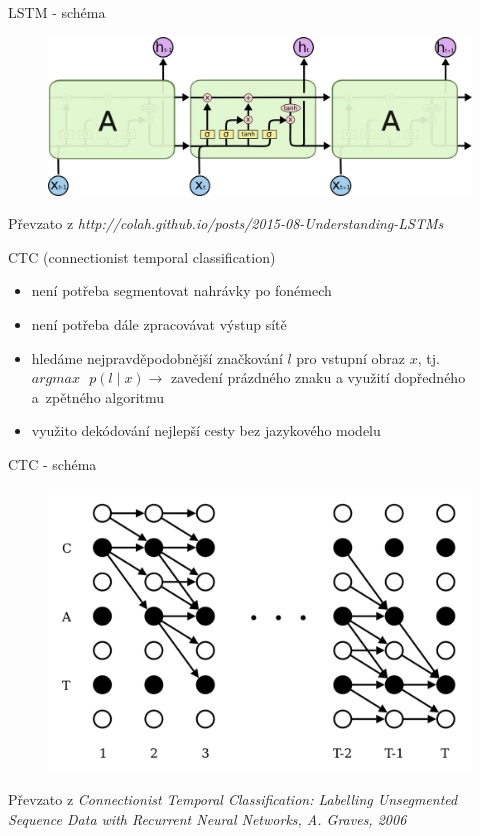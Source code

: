 \documentclass[10pt]{beamer}
\begin{document}
\begin{frame}{LSTM - schéma}
	\begin{figure}
		\includegraphics[width= 0.8\linewidth]{lstm.png}
	\end{figure}
	Převzato z \textit{http://colah.github.io/posts/2015-08-Understanding-LSTMs}
\end{frame}

\begin{frame}{CTC (connectionist temporal classification)}
	\begin{itemize}
		\item není potřeba segmentovat nahrávky po fonémech
		\item není potřeba dále zpracovávat výstup sítě
		\item hledáme nejpravděpodobnější značkování $ l $ pro vstupní obraz $ x $, tj. $ argmax \text{ } p(l \mid x) \rightarrow $ zavedení prázdného znaku a využití dopředného a~zpětného algoritmu 
		\item využito dekódování nejlepší cesty bez jazykového modelu
	\end{itemize}
\end{frame}

\begin{frame}{CTC - schéma}
	\begin{figure}
		\includegraphics[width= 0.8\linewidth]{ctc.png}
	\end{figure}
	
	Převzato z \textit{Connectionist Temporal Classification: Labelling Unsegmented Sequence Data with Recurrent Neural Networks, A. Graves, 2006}
\end{frame}
\end{document}
